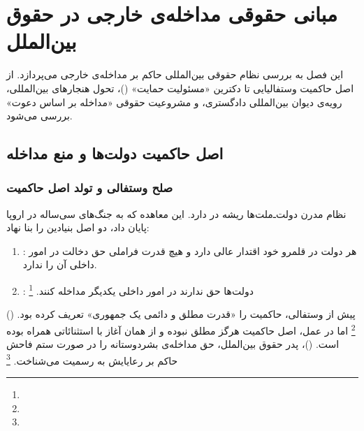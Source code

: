 \chapter{مبانی حقوقی مداخله‌ی خارجی در حقوق بین‌الملل}
\label{ch:legal}

\begin{tcolorbox}[mybox, title={چکیده‌ی فصل}]
این فصل به بررسی نظام حقوقی بین‌المللی حاکم بر مداخله‌ی خارجی می‌پردازد. از اصل حاکمیت وستفالیایی تا دکترین «مسئولیت حمایت» ()، تحول هنجارهای بین‌المللی، رویه‌ی دیوان بین‌المللی دادگستری، و مشروعیت حقوقی «مداخله بر اساس دعوت» بررسی می‌شود.
\end{tcolorbox}

\section{اصل حاکمیت دولت‌ها و منع مداخله}
\label{sec:ch02-sovereignty}


\subsection{صلح وستفالی و تولد اصل حاکمیت}
\label{subsec:ch02-westphalia}

نظام مدرن دولت‌ـ‌ملت‌ها ریشه در  دارد. این معاهده که به جنگ‌های سی‌ساله در اروپا پایان داد، دو اصل بنیادین را بنا نهاد:

\begin{enumerate}[nosep, label=\textbf{\arabic*.}]
  \item {}: هر دولت در قلمرو خود اقتدار عالی دارد و هیچ قدرت فراملی حق دخالت در امور داخلی آن را ندارد.
  \item {}: دولت‌ها حق ندارند در امور داخلی یکدیگر مداخله کنند.%
  \footnote{}
\end{enumerate}

 () پیش از وستفالی، حاکمیت را «قدرت مطلق و دائمی یک جمهوری» تعریف کرده بود.%
\footnote{}
اما در عمل، اصل حاکمیت هرگز مطلق نبوده و از همان آغاز با استثنائاتی همراه بوده است.  ()، پدر حقوق بین‌الملل، حق مداخله‌ی بشردوستانه را در صورت ستم فاحش حاکم بر رعایایش به رسمیت می‌شناخت.%
\footnote{}

